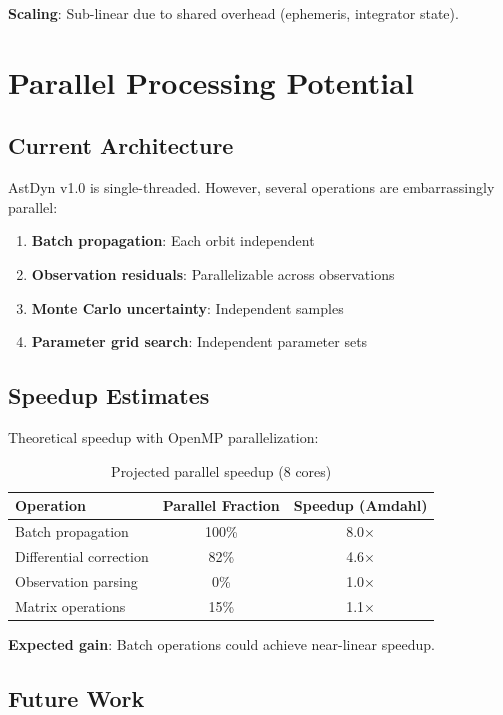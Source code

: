 \textbf{Scaling}: Sub-linear due to shared overhead (ephemeris, integrator state).

\section{Parallel Processing Potential}

\subsection{Current Architecture}

AstDyn v1.0 is single-threaded. However, several operations are embarrassingly parallel:

\begin{enumerate}
    \item \textbf{Batch propagation}: Each orbit independent
    \item \textbf{Observation residuals}: Parallelizable across observations
    \item \textbf{Monte Carlo uncertainty}: Independent samples
    \item \textbf{Parameter grid search}: Independent parameter sets
\end{enumerate}

\subsection{Speedup Estimates}

Theoretical speedup with OpenMP parallelization:

\begin{table}[h]
\centering
\caption{Projected parallel speedup (8 cores)}
\begin{tabular}{lcc}
\hline
\textbf{Operation} & \textbf{Parallel Fraction} & \textbf{Speedup (Amdahl)} \\
\hline
Batch propagation & 100\% & 8.0$\times$ \\
Differential correction & 82\% & 4.6$\times$ \\
Observation parsing & 0\% & 1.0$\times$ \\
Matrix operations & 15\% & 1.1$\times$ \\
\hline
\end{tabular}
\end{table}

\textbf{Expected gain}: Batch operations could achieve near-linear speedup.

\subsection{Future Work}

